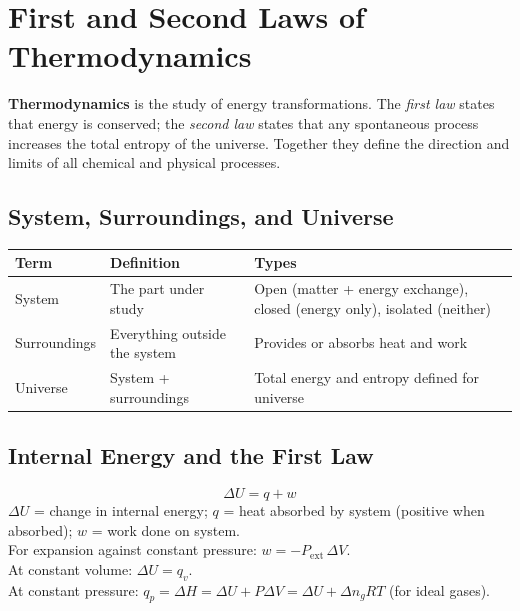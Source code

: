 \documentclass[12pt,a4paper]{article}
\begin{document}
\section{First and Second Laws of Thermodynamics}

\begin{tcolorbox}[defbox]
\textbf{Thermodynamics} is the study of energy transformations. The \emph{first law} states that energy is conserved; the \emph{second law} states that any spontaneous process increases the total entropy of the universe. Together they define the direction and limits of all chemical and physical processes.
\end{tcolorbox}

\subsection{System, Surroundings, and Universe}
\begin{tabularx}{\linewidth}{|B{2.4cm}|Y|Y|}
\hline
\textbf{Term} & \textbf{Definition} & \textbf{Types} \\
\hline
System & The part under study & Open (matter + energy exchange), closed (energy only), isolated (neither) \\
\hline
Surroundings & Everything outside the system & Provides or absorbs heat and work \\
\hline
Universe & System + surroundings & Total energy and entropy defined for universe \\
\hline
\end{tabularx}

\subsection{Internal Energy and the First Law}
\begin{tcolorbox}[formulabox, title={First Law of Thermodynamics}]
\[
\Delta U = q + w
\]
$\Delta U$ = change in internal energy; $q$ = heat absorbed by system (positive when absorbed); $w$ = work done on system.\\
For expansion against constant pressure: $w = -P_{\mathrm{ext}}\,\Delta V$.\\
At constant volume: $\Delta U = q_v$.\\
At constant pressure: $q_p = \Delta H = \Delta U + P\Delta V = \Delta U + \Delta n_g RT$ (for ideal gases).
\end{tcolorbox}
\end{document}
